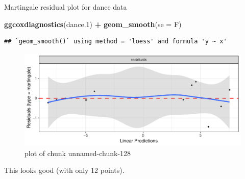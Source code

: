 \documentclass[ignorenonframetext,]{beamer}
\newenvironment{Shaded}{\begin{snugshade}}{\end{snugshade}}
\newcommand{\DataTypeTok}[1]{\textcolor[rgb]{0.13,0.29,0.53}{#1}}
\newcommand{\FloatTok}[1]{\textcolor[rgb]{0.00,0.00,0.81}{#1}}
\newcommand{\KeywordTok}[1]{\textcolor[rgb]{0.13,0.29,0.53}{\textbf{#1}}}
\newcommand{\NormalTok}[1]{#1}
\newcommand{\OperatorTok}[1]{\textcolor[rgb]{0.81,0.36,0.00}{\textbf{#1}}}
\newcommand{\StringTok}[1]{\textcolor[rgb]{0.31,0.60,0.02}{#1}}
\begin{document}
\begin{frame}[fragile]{Martingale residual plot for dance data}
\protect\hypertarget{martingale-residual-plot-for-dance-data}{}

\begin{Shaded}
\begin{Highlighting}[]
\KeywordTok{ggcoxdiagnostics}\NormalTok{(dance}\FloatTok{.1}\NormalTok{) }\OperatorTok{+}\StringTok{ }\KeywordTok{geom_smooth}\NormalTok{(}\DataTypeTok{se =}\NormalTok{ F)}
\end{Highlighting}
\end{Shaded}

\begin{verbatim}
## `geom_smooth()` using method = 'loess' and formula 'y ~ x'
\end{verbatim}

\begin{figure}
\centering
\includegraphics{figure/unnamed-chunk-128-1.pdf}
\caption{plot of chunk unnamed-chunk-128}
\end{figure}

This looks good (with only 12 points).

\end{frame}
\end{document}
